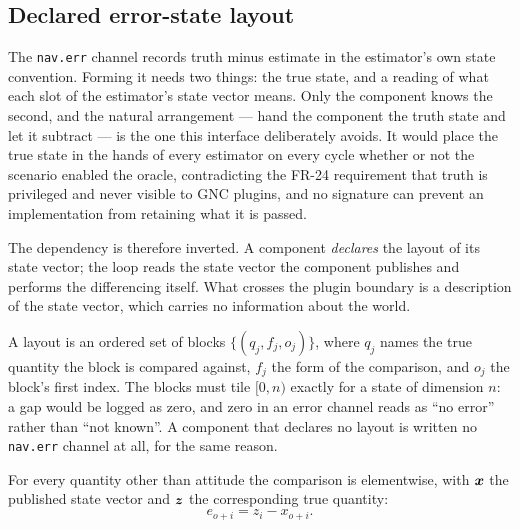 \subsection{Declared error-state layout}
\label{sec:gnc:errlayout}

The \texttt{nav.err} channel records truth minus estimate in the
estimator's own state convention. Forming it needs two things: the true
state, and a reading of what each slot of the estimator's state vector
means. Only the component knows the second, and the natural arrangement
--- hand the component the truth state and let it subtract --- is the one
this interface deliberately avoids. It would place the true state in the
hands of every estimator on every cycle whether or not the scenario
enabled the oracle, contradicting the FR-24 requirement that truth is
privileged and never visible to GNC plugins, and no signature can prevent
an implementation from retaining what it is passed.

The dependency is therefore inverted. A component \emph{declares} the
layout of its state vector; the loop reads the state vector the component
publishes and performs the differencing itself. What crosses the plugin
boundary is a description of the state vector, which carries no
information about the world.

A layout is an ordered set of blocks $\{(q_j, f_j, o_j)\}$, where $q_j$
names the true quantity the block is compared against, $f_j$ the form of
the comparison, and $o_j$ the block's first index. The blocks must tile
$[0, n)$ exactly for a state of dimension $n$: a gap would be logged as
zero, and zero in an error channel reads as ``no error'' rather than
``not known''. A component that declares no layout is written no
\texttt{nav.err} channel at all, for the same reason.

For every quantity other than attitude the comparison is elementwise,
with $\bm{x}$ the published state vector and $\bm{z}$ the corresponding
true quantity:
\begin{equation}
  e_{o+i} = z_i - x_{o+i}.
  \label{eq:gnc:errdiff}
\end{equation}

